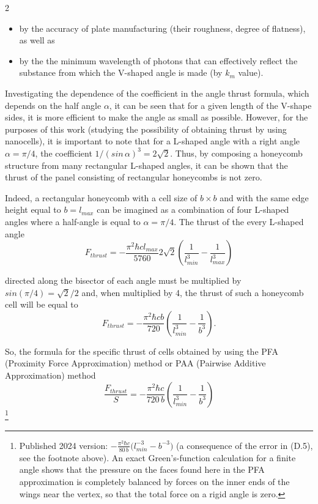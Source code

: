 \documentclass[twoside, 10pt]{article}
\begin{document}
\begin{multicols}{2}
\begin{itemize}
\item
  by the accuracy of plate manufacturing (their roughness,
  degree of flatness), as well as
\item
  by the the minimum wavelength of photons that can effectively reflect
  the substance from which the \mbox{V-shaped} angle is made (by \(k_m\) value).
\end{itemize}

    Investigating the dependence of the coefficient in the angle thrust
formula, which depends on the half angle \(\alpha\), it can be
seen that for a given length of the  \mbox{V-shape} sides, it is more efficient
to make the angle as small as possible. However, for the purposes of
this work (studying the possibility of obtaining thrust by using
nanocells), it is important to note that for a \mbox{L-shaped} angle with a right angle
\(\alpha = {\pi}/{4}\), the coefficient
\(1\big/\left(sin\, \alpha\right)^3 = 2\sqrt{2}\).
Thus, by composing a honeycomb structure from many
rectangular \mbox{L-shaped} angles, it can be shown that the thrust of the panel consisting
of rectangular honeycombs is not zero.

Indeed, a rectangular honeycomb with a cell size of \(b \times b\) and
with the same edge height equal to \(b = l_{max}\) can be imagined as a
combination of four \mbox{L-shaped} angles where a half-angle is equal to
\(\alpha = {\pi}/{4}\). The thrust of the every \mbox{L-shaped} angle
\noindent
\begin{equation}F_{thrust} = - \frac{\pi^2\hbar c l_{max}}{5760} 2\sqrt{2} \left(\frac{1}{l_{min}^3} - \frac{1}{l_{max}^3}\right)\end{equation}

directed along the bisector of each angle must be multiplied by
\(sin\left({\pi}/{4}\right)={\sqrt{2}}\big/{2}\) and, when multiplied by
4, the thrust of such a honeycomb cell will be equal to
\noindent
\begin{equation}F_{thrust} = - \frac{\pi^2\hbar c b}{720} \left(\frac{1}{l_{min}^3} - \frac{1}{b^3}\right).\end{equation}

So, the formula for the specific thrust of cells obtained by using the PFA
(Proximity Force Approximation) method or PAA (Pairwise Additive
Approximation) method
\noindent
\begin{equation}\frac{F_{thrust}}{S} = - \frac{\pi^2\hbar c}{720\, b} \left(\frac{1}{l_{min}^3} - \frac{1}{b^3}\right)\end{equation}\footnote{Published 2024 version: \(-\frac{\pi^2\hbar c}{80\,b}\big(l_{min}^{-3}-b^{-3}\big)\) (a consequence of the error in (D.5), see the footnote above). An exact Green's-function calculation for a finite angle \cite{AngleNotebook} shows that the pressure on the faces found here in the PFA approximation is completely balanced by forces on the inner ends of the wings near the vertex, so that the total force on a rigid angle is zero.}


\end{multicols}
\end{document}
